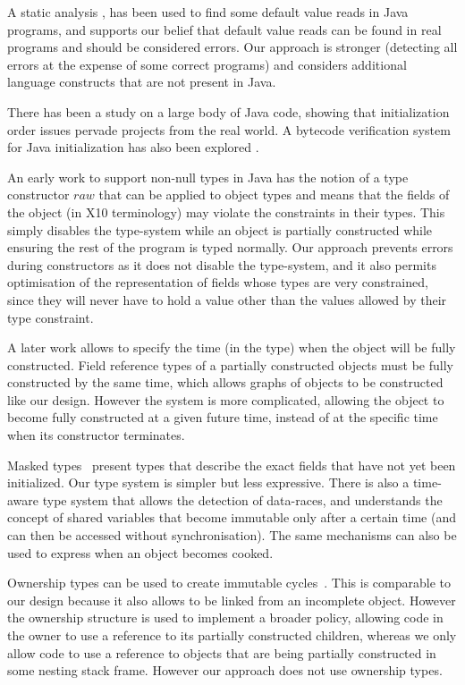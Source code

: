 A static analysis \cite{Seo:2007:SBD:1522565.1522587}, has been used to find
some default value reads in Java programs, and supports our belief that default
value reads can be found in real programs and should be considered errors.  Our
approach is stronger (detecting all errors at the expense of some correct
programs) and considers additional language constructs that are not present in
Java.

There has been a study on a large body \cite{Gil:2009:WRS:1615184.1615216} of
Java code, showing that initialization order issues pervade projects from the
real world.  A bytecode verification system for Java initialization has also
been explored \cite{Hubert:2010:ESO:1888881.1888890}.

An early work to support non-null types in Java
\cite{Fahndrich:2003:DCN:949305.949332} has the notion of a type constructor
$raw$ that can be applied to object types and means that the fields of the
object (in X10 terminology) may violate the constraints in their types.  This
simply disables the type-system while an object is partially constructed while
ensuring the rest of the program is typed normally.  Our approach prevents
errors during constructors as it does not disable the type-system, and it also
permits optimisation of the representation of fields whose types are very
constrained, since they will never have to hold a value other than the values
allowed by their type constraint.

A later work \cite{Fahndrich:2007:EOI:1297027.1297052,XinQi:2009} allows
    to specify the time
    (in the type) when the object will be fully constructed.
Field reference types of a partially constructed objects must be fully
constructed by the same time, which allows graphs of objects to be constructed
like our  design.  However the system is more complicated, allowing
the object to become fully constructed at a given future time, instead of at
the specific time when its constructor terminates.

Masked types~\cite{XinQi:2009} present types that
    describe the exact fields that have not yet been initialized.
Our type system is simpler but less expressive.
There is also a time-aware type system \cite{Matsakis:2010:TTS:1869459.1869511}
that allows the detection of data-races, and understands the concept of shared
variables that become immutable only after a certain time
(and can then be accessed without synchronisation).  The same mechanisms can also be
used to express when an object becomes cooked.

Ownership types can be used to create immutable cycles~\cite{Zibin:2010:OIG:1869459.1869509}.
This is comparable to
our  design because it also allows  to be linked from an
incomplete object.  However the ownership structure is used to implement a
broader policy, allowing code in the owner to use a reference to its partially
constructed children, whereas we only allow code to use a reference to objects
that are being partially constructed in some nesting stack frame.  However our
approach does not use ownership types.
